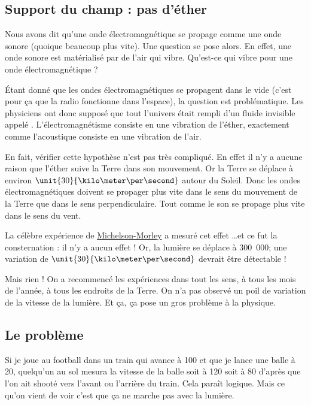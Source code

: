 \subsection{Support du champ : pas d'éther}

Nous avons dit qu'une onde électromagnétique se propage comme une onde sonore (quoique beaucoup plus vite). Une question se pose alors. En effet, une onde sonore est matérialisé par de l'air qui vibre. Qu'est-ce qui vibre pour une onde électromagnétique ?

Étant donné que les ondes électromagnétiques se propagent dans le vide (c'est pour ça que la radio fonctionne dans l'espace), la question est problématique. Les physiciens ont donc supposé que tout l'univers était rempli d'un fluide invisible appelé . L'électromagnétisme consiste en une vibration de l'éther, exactement comme l'acoustique consiste en une vibration de l'air.

En fait, vérifier cette hypothèse n'est pas très compliqué. En effet il n'y a aucune raison que l'éther suive la Terre dans son mouvement. Or la Terre se déplace à environ $\unit{30}{\kilo\meter\per\second}$ autour du Soleil. Donc les ondes électromagnétiques doivent se propager plus vite dans le sens du mouvement de la Terre que dans le sens perpendiculaire. Tout comme le son se propage plus vite dans le sens du vent.

La célèbre expérience de \href{http://fr.wikipedia.org/wiki/Expérience\_d'interférométrie\_de\_Michelson\_et\_Morley}{Michelson-Morley} a mesuré cet effet \ldots et ce fut la consternation : il n'y a aucun effet ! Or, la lumière se déplace à \unit{300.000}{\kilo\meter\per\second}; une variation de $\unit{30}{\kilo\meter\per\second}$ devrait être détectable !

Mais rien ! On a recommencé les expériences dans tout les sens, à tous les mois de l'année, à tous les endroits de la Terre. On n'a pas observé un poil de variation de la vitesse de la lumière. Et ça, ça pose un gros problème à la physique.


\subsection{Le problème}

Si je joue au football dans un train qui avance à \unit{100}{\kilo\meter\per\hour} et que je lance une balle à \unit{20}{\kilo\meter\per\hour}, quelqu'un au sol mesura la vitesse de la balle soit à \unit{120}{\kilo\meter\per\hour} soit à \unit{80}{\kilo\meter\per\hour} d'après que l'on ait shooté vers l'avant ou l'arrière du train. Cela paraît logique. Mais ce qu'on vient de voir c'est que ça ne marche pas avec la lumière.

